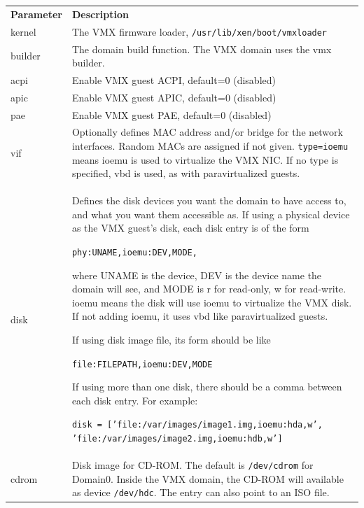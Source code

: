 \documentclass[11pt,twoside,final,openright]{report}
\begin{document}
\begin{tabular}{lp{11.0cm}}

{\bfseries Parameter} & {\bfseries Description} \\

kernel &        The VMX firmware loader, {\small {\tt /usr/lib/xen/boot/vmxloader}}\\

builder &       The domain build function. The VMX domain uses the vmx builder.\\

acpi & Enable VMX guest ACPI, default=0 (disabled)\\

apic & Enable VMX guest APIC, default=0 (disabled)\\

pae & Enable VMX guest PAE, default=0 (disabled)\\

vif     & Optionally defines MAC address and/or bridge for the network interfaces. Random MACs are assigned if not given. {\small {\tt type=ioemu}} means ioemu is used to virtualize the VMX NIC. If no type is specified, vbd is used, as with paravirtualized guests.\\

disk & Defines the disk devices you want the domain to have access to, and what you want them accessible as. If using a physical device as the VMX guest's disk, each disk entry is of the form 

{\small {\tt phy:UNAME,ioemu:DEV,MODE,}}

where UNAME is the device, DEV is the device name the domain will see, and MODE is r for read-only, w for read-write. ioemu means the disk will use ioemu to virtualize the VMX disk. If not adding ioemu, it uses vbd like paravirtualized guests.

If using disk image file, its form should be like 

{\small {\tt file:FILEPATH,ioemu:DEV,MODE}}

If using more than one disk, there should be a comma between each disk entry. For example:

{\scriptsize {\tt disk = ['file:/var/images/image1.img,ioemu:hda,w', 'file:/var/images/image2.img,ioemu:hdb,w']}}\\

cdrom   & Disk image for CD-ROM. The default is {\small {\tt /dev/cdrom}} for Domain0. Inside the VMX domain, the CD-ROM will available as device {\small {\tt /dev/hdc}}. The entry can also point to an ISO file.\\


\end{tabular}
\end{document}
